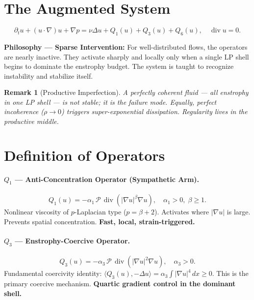 \documentclass[11pt]{article}
\newtheorem{remark}[theorem]{Remark}
\begin{document}
\section{The Augmented System}

\[
\partial_t u + (u\cdot\nabla)u + \nabla p = \nu\Delta u + Q_1(u) + Q_3(u) + Q_6(u),\quad
\operatorname{div} u = 0.
\]

\textbf{Philosophy --- Sparse Intervention:} For well-distributed flows, the operators are nearly
inactive. They activate sharply and locally only when a single LP shell begins to dominate the
enstrophy budget. The system is taught to recognize instability and stabilize itself.

\begin{remark}[Productive Imperfection]
A perfectly coherent fluid --- all enstrophy in one LP shell --- is not stable; it is the
failure mode. Equally, perfect incoherence ($\rho\to 0$) triggers super-exponential dissipation.
Regularity lives in the productive middle.
\end{remark}

\section{Definition of Operators}

\paragraph{$Q_1$ --- Anti-Concentration Operator (Sympathetic Arm).}
\[
Q_1(u) = -\alpha_1\, \mathcal{P}\,\operatorname{div}(|\nabla u|^\beta \nabla u),\quad
\alpha_1>0,\;\beta\geq 1.
\]
Nonlinear viscosity of $p$-Laplacian type ($p=\beta+2$). Activates where $|\nabla u|$ is large.
Prevents spatial concentration. \textbf{Fast, local, strain-triggered.}

\paragraph{$Q_3$ --- Enstrophy-Coercive Operator.}
\[
Q_3(u) = -\alpha_3\,\mathcal{P}\,\operatorname{div}(|\nabla u|^2 \nabla u),\quad \alpha_3>0.
\]
Fundamental coercivity identity:
$\langle Q_3(u), -\Delta u\rangle = \alpha_3\int|\nabla u|^4\,dx \geq 0$.
This is the primary coercive mechanism. \textbf{Quartic gradient control in the dominant shell.}
\end{document}
